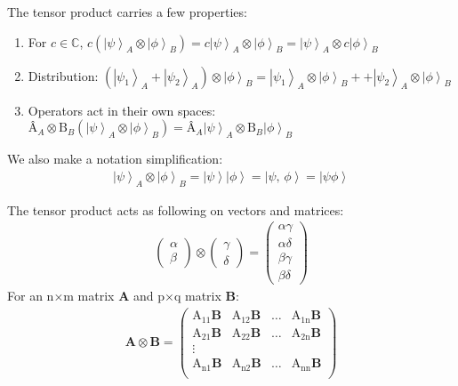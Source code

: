 \documentclass[11pt]{article} %
\newcommand{\ket}[1]{\left|#1\right\rangle}
\begin{document}
The tensor product carries a few properties:

\begin{enumerate}
    \item For $c \in \mathbb{C}$, $c\left(\ket{\psi}_A \otimes \ket{\phi}_B\right) = c\ket{\psi}_A \otimes \ket{\phi}_B = \ket{\psi}_A \otimes c\ket{\phi}_B$
    \item Distribution: $\left(\ket{\psi_1}_A + \ket{\psi_2}_A\right)\otimes \ket{\phi}_B = \ket{\psi_1}_A \otimes \ket{\phi}_B + + \ket{\psi_2}_A \otimes \ket{\phi}_B$
    \item Operators act in their own spaces: $\textrm{\^A}_A \otimes \textrm{\^B}_B\left(\ket{\psi}_A \otimes \ket{\phi}_B\right) = \textrm{\^A}_A\ket{\psi}_A \otimes \textrm{\^B}_B\ket{\phi}_B$
\end{enumerate}

\noindent We also make a notation simplification:
\begin{align}
    \ket{\psi}_A \otimes \ket{\phi}_B = \ket{\psi}\ket{\phi} = \ket{\psi,\,\phi} = \ket{\psi\phi} \nonumber
\end{align}

\noindent The tensor product acts as following on vectors and matrices:
\begin{align}
    \begin{pmatrix}
        \alpha\\
        \beta
    \end{pmatrix} \otimes
    \begin{pmatrix}
        \gamma\\
        \delta
    \end{pmatrix} = 
    \begin{pmatrix}
        \alpha\gamma\\
        \alpha\delta\\
        \beta\gamma\\
        \beta\delta
    \end{pmatrix} \nonumber
\end{align}
\noindent For an n$\times$m matrix \textbf{A} and p$\times$q matrix \textbf{B}:
\begin{align}
    \textbf{A} \otimes \textbf{B} = 
    \begin{pmatrix}
        \textrm{A}_{11}\textbf{B} & \textrm{A}_{12}\textbf{B} & \hdots & \textrm{A}_{1\textrm{n}}\textbf{B}\\
        \textrm{A}_{21}\textbf{B} & \textrm{A}_{22}\textbf{B} & \hdots & \textrm{A}_{2\textrm{n}}\textbf{B}\\
        \vdots \\
        \textrm{A}_{\textrm{n}1}\textbf{B} & \textrm{A}_{\textrm{n}2}\textbf{B} & \hdots & \textrm{A}_{\textrm{n}\textrm{n}}\textbf{B}\\
    \end{pmatrix}\nonumber
\end{align}
\end{document}
